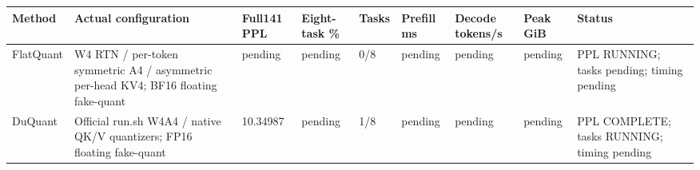 \begin{tabular}{lllllllll}
\toprule
Method & Actual configuration & Full141 PPL & Eight-task \% & Tasks & Prefill ms & Decode tokens/s & Peak GiB & Status \\
\midrule
FlatQuant & W4 RTN / per-token symmetric A4 / asymmetric per-head KV4; BF16 floating fake-quant & pending & pending & 0/8 & pending & pending & pending & PPL RUNNING; tasks pending; timing pending \\
DuQuant & Official run.sh W4A4 / native QK/V quantizers; FP16 floating fake-quant & 10.34987 & pending & 1/8 & pending & pending & pending & PPL COMPLETE; tasks RUNNING; timing pending \\
\bottomrule
\end{tabular}
